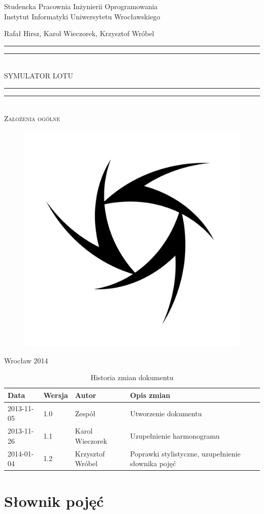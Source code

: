 \documentclass{mwrep}
\newcommand*{\titleGP}{\begingroup
\centering

{\large Studencka Pracownia Inżynierii Oprogramowania}\\Instytut Informatyki Uniwersytetu Wrocławskiego\par
\vspace*{16\baselineskip}

{\Large Rafał Hirsz, Karol Wieczorek, Krzysztof Wróbel\par}
\vspace*{\baselineskip}

\rule{\textwidth}{1.6pt}\vspace*{-\baselineskip}\vspace*{2pt}
\rule{\textwidth}{0.4pt}\\[\baselineskip]

{\Huge SYMULATOR LOTU}\\[0.2\baselineskip]

\rule{\textwidth}{0.4pt}\vspace*{-\baselineskip}\vspace{3.2pt}
\rule{\textwidth}{1.6pt}\\[\baselineskip]

\scshape
{\huge Założenia ogólne}\par
\vspace*{2\baselineskip}

\begin{figure}[h]
\centering
\includegraphics[width=5\baselineskip]{flightsim-team-logo.pdf}
\end{figure}
\vfill

{\large Wrocław 2014}\par

\pagebreak

\endgroup}
\begin{document}
\thispagestyle{empty}
\titleGP

\begin{center}
\begin{table}[h]
\begin{center}
\caption{Historia zmian dokumentu}\label{T:Zmiany}
\vspace{3ex}
\begin{tabularx}{1\textwidth}{|l|l|l|X|}
\hline
Data & Wersja & Autor & Opis zmian \\ \hline
2013-11-05 & 1.0 & Zespół & Utworzenie dokumentu \\
2013-11-26 & 1.1 & Karol Wieczorek & Uzupełnienie harmonogramu \\
2014-01-04 & 1.2 & Krzysztof Wróbel & Poprawki stylistyczne, uzupełnienie słownika pojęć \\
\hline
\end{tabularx}
\end{center}
\end{table}
\end{center}

\pagebreak

\tableofcontents

\chapter{Słownik pojęć}
\end{document}
